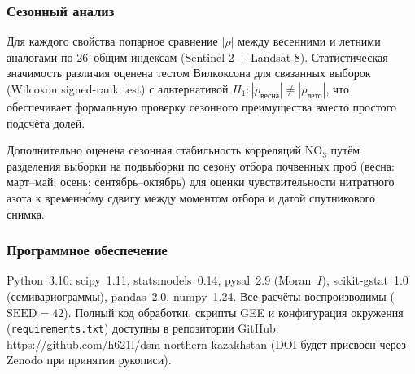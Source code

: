 \subsubsection{Сезонный анализ}

Для каждого свойства попарное сравнение $|\rho|$ между весенними и летними аналогами по 26~общим индексам (Sentinel-2 + Landsat-8). Статистическая значимость различия оценена тестом Вилкоксона для связанных выборок (Wilcoxon signed-rank test) с альтернативой $H_1: |\rho_{\text{весна}}| \neq |\rho_{\text{лето}}|$, что обеспечивает формальную проверку сезонного преимущества вместо простого подсчёта долей.

Дополнительно оценена сезонная стабильность корреляций NO$_3$ путём разделения выборки на подвыборки по сезону отбора почвенных проб (весна: март--май; осень: сентябрь--октябрь) для оценки чувствительности нитратного азота к временн\'{о}му сдвигу между моментом отбора и датой спутникового снимка.

\subsubsection{Программное обеспечение}

Python~3.10: scipy~1.11, statsmodels~0.14, pysal~2.9 (Moran~$I$), scikit-gstat~1.0 (семивариограммы), pandas~2.0, numpy~1.24. Все расчёты воспроизводимы ($\text{SEED} = 42$). Полный код обработки, скрипты GEE и конфигурация окружения (\texttt{requirements.txt}) доступны в репозитории GitHub: \url{https://github.com/h621l/dsm-northern-kazakhstan} (DOI будет присвоен через Zenodo при принятии рукописи).
